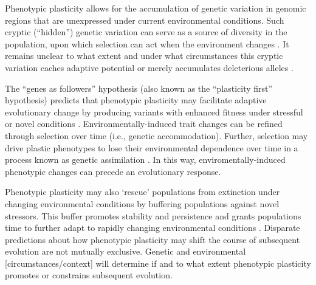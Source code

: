 Phenotypic plasticity allows for the accumulation of genetic variation in genomic regions that are unexpressed under current environmental conditions.
Such cryptic (``hidden'') genetic variation can serve as a source of diversity in the population, upon which selection can act when the environment changes \citep{schlichting_hidden_2008,levis_evaluating_2016}.  
It remains unclear to what extent and under what circumstances this cryptic variation caches adaptive potential or merely accumulates deleterious alleles \citep{gibson_uncovering_2004,paaby_cryptic_2014,zheng_cryptic_2019}.

The ``genes as followers'' hypothesis (also known as the ``plasticity first'' hypothesis) predicts that phenotypic plasticity may facilitate adaptive evolutionary change by producing variants with enhanced fitness under stressful or novel conditions \citep{west-eberhard_developmental_2003,schwander_genes_2011,levis_evaluating_2016}. 
Environmentally-induced trait changes can be refined through selection over time (i.e., genetic accommodation).
Further, selection may drive plastic phenotypes to lose their environmental dependence over time in a process known as genetic assimilation \citep{west-eberhard_developmental_2005,pigliucci_phenotypic_2006,crispo_baldwin_2007,schlichting_phenotypic_2014,levis_evaluating_2016}. 
In this way, enviromentally-induced phenotypic changes can precede an evolutionary response.


Phenotypic plasticity may also `rescue' populations from extinction under changing environmental conditions by buffering populations against novel stressors.
This buffer promotes stability and persistence and grants populations time to further adapt to rapidly changing environmental conditions \citep{west-eberhard_developmental_2003,chevin_when_2010}. %
Disparate predictions about how phenotypic plasticity may shift the course of subsequent evolution are not mutually exclusive.
Genetic and environmental [circumstances/context] will determine if and to what extent phenotypic plasticity promotes or constrains subsequent evolution.

